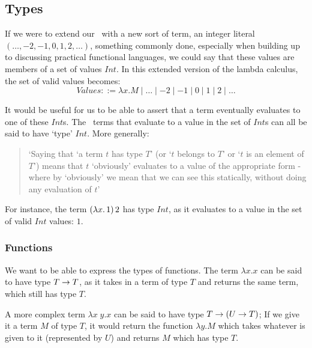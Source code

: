 \subsection{Types}
If we were to extend our \lcalc\ with a new sort of term, an integer literal \((\dots, -2, -1, 0, 1, 2, \dots)\), something commonly done, especially when building up to discussing practical functional languages, we could say that these values are members of a set of values $Int$. In this extended version of the lambda calculus, the set of valid values becomes:
\[Values ::= \lambda x. M \mid \dots \mid -2\mid -1\mid 0\mid 1\mid 2\mid \dots \]

\noindent It would be useful for us to be able to assert that a term eventually evaluates to one of these $Int$s. The \lcalc\ terms that evaluate to a value in the set of $Int$s can all be said to have `type' $Int$. More generally: 
\begin{quote}
`Saying that `a term $t$ has type $T$' (or `$t$ belongs to $T$' or `$t$ is an element of $T$') means that $t$ `obviously' evaluates to a value of the appropriate form - where by `obviously' we mean that we can see this statically, without doing any evaluation of $t$' \cite{pierce2002types}
\end{quote}

\noindent For instance, the term \((\lambda x.\, 1)\, 2\) has type $Int$, as it evaluates to a value in the set of valid $Int$ values: $1$. 


\subsubsection{Functions}
We want to be able to express the types of functions. The term \(\lambda x. x\) can be said to have type \(T \rightarrow T\), as it takes in a term of type $T$ and returns the same term, which still has type $T$.

A more complex term \(\lambda x\;y.x\) can be said to have type \(T \rightarrow (U \rightarrow T)\); If we give it a term $M$ of type $T$, it would return the function \(\lambda y.M\) which takes whatever is given to it (represented by $U$) and returns $M$ which has type $T$. 

